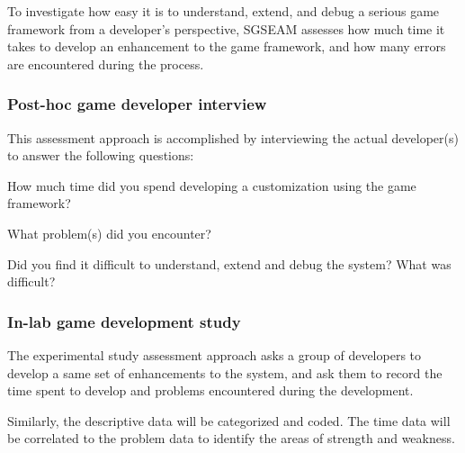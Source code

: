 To investigate how easy it is to understand, extend, and debug a serious game
framework from a developer's perspective, SGSEAM assesses how much time it takes to develop an
enhancement to the game framework, and how many errors are encountered
during the process.

\subsubsection{Post-hoc game developer interview}
\label{Post-hoc game developer interview}

This assessment approach is accomplished by interviewing the actual developer(s) to
answer the following questions:\\
 
\begin{compactitem}
\item How much time did you spend developing a customization using the game framework?
\item What problem(s) did you encounter?
\item Did you find it difficult to understand, extend and debug the system? What was difficult?\\
\end{compactitem}

\subsubsection{In-lab game development study}
\label{In-lab game development study}

The experimental study assessment approach asks a group of developers to develop a same set of
enhancements to the system, and ask them to record the time spent to develop and problems
encountered during the development.

Similarly, the descriptive data will be categorized and coded. The time data will be correlated to the problem data to identify the areas of strength and weakness.
